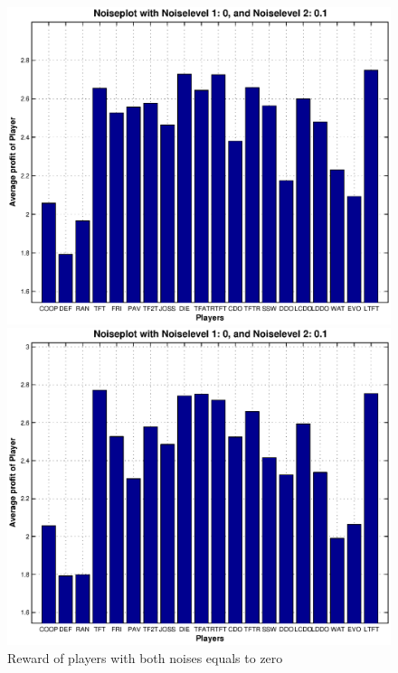 \begin{figure}[h]

\begin{minipage}[hbt]{0.68\textwidth}
	\centering
	\includegraphics[width=\textwidth]{pics/simulation1/Reward_of_all_Players_at_given_Noiselevels_2}
\end{minipage}
\hfill
\begin{minipage}[hbt]{0.3\textwidth}
	\centering
	\includegraphics[width=\textwidth]{pics/simulation2/Reward_of_all_Players_at_given_Noiselevels_2}
\end{minipage}	\caption{Reward of players with both noises equals to zero}
	\label{pic player noise1}
\end{figure}

